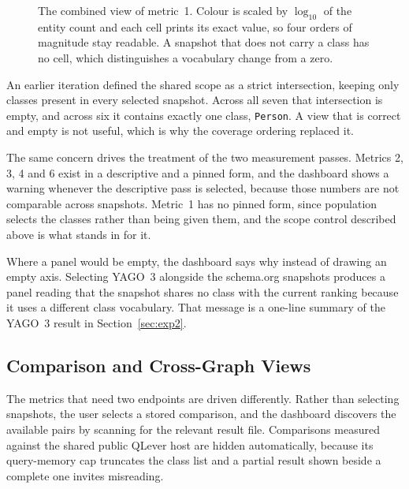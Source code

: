 \begin{figure}[htbp]
  \centering
  \caption[]{The combined view of metric~1. Colour is
    scaled by $\log_{10}$ of the entity count and each cell prints its exact
    value, so four orders of magnitude stay readable. A snapshot that does not
    carry a class has no cell, which distinguishes a vocabulary change from a
    zero.}
  \label{fig:dash_combined}
\end{figure}

An earlier iteration defined the shared scope as a strict intersection, keeping
only classes present in every selected snapshot. Across all seven that
intersection is empty, and across six it contains exactly one class,
\texttt{Person}. A view that is correct and empty is not useful, which is why the
coverage ordering replaced it.

The same concern drives the treatment of the two measurement passes. Metrics 2,
3, 4 and 6 exist in a descriptive and a pinned form, and the dashboard shows a
warning whenever the descriptive pass is selected, because those numbers are not
comparable across snapshots. Metric~1 has no pinned form, since population
selects the classes rather than being given them, and the scope control described
above is what stands in for it.

Where a panel would be empty, the dashboard says why instead of drawing an empty
axis. Selecting YAGO~3 alongside the schema.org snapshots produces a panel
reading that the snapshot shares no class with the current ranking because it
uses a different class vocabulary. That message is a one-line summary of the
YAGO~3 result in Section~\ref{sec:exp2}.

\subsection{Comparison and Cross-Graph Views}
\label{subsec:dash_pairs}

The metrics that need two endpoints are driven differently. Rather than selecting
snapshots, the user selects a stored comparison, and the dashboard discovers the
available pairs by scanning for the relevant result file. Comparisons measured
against the shared public QLever host are hidden automatically, because its
query-memory cap truncates the class list and a partial result shown beside a
complete one invites misreading.

